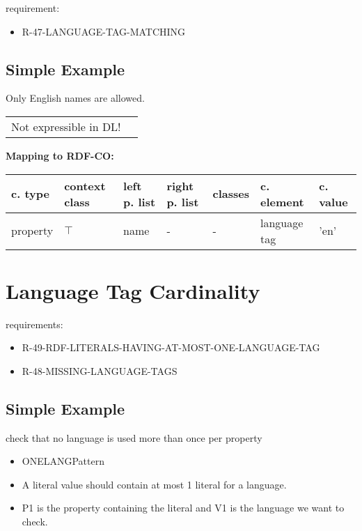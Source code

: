 \documentclass{llncs}
\newenvironment{gcotable}{
  \scriptsize
  \sffamily
  \vspace{0cm}
	\begin{center}
	\textbf{\vspace{0.4cm}Mapping to RDF-CO:} \\
  \begin{tabular}{l|l|l|l|l|l|l}
	\hline
  \textbf{c. type} & \textbf{context class} & \textbf{left p. list} & \textbf{right p. list} & \textbf{classes} & \textbf{c. element} & \textbf{c. value} \\
  \hline

}{
  \hline
  \end{tabular}
	\end{center}
}
\newenvironment{DL}{
  \vspace{0cm}
	\begin{center}
  \begin{tabular}{r l}

}{
  \end{tabular}
	\end{center}
}
\begin{document}
requirement:

\begin{itemize}
	\item R-47-LANGUAGE-TAG-MATCHING
\end{itemize}

\subsection{Simple Example}

Only English names are allowed.

\begin{DL}
Not expressible in DL!
\end{DL}

\begin{gcotable}
property & $\top$ & name & - & - & language tag & 'en' \\
\end{gcotable}

\section{Language Tag Cardinality}

requirements:

\begin{itemize}
	\item R-49-RDF-LITERALS-HAVING-AT-MOST-ONE-LANGUAGE-TAG
	\item R-48-MISSING-LANGUAGE-TAGS
\end{itemize}

\subsection{Simple Example}

check that no language is used more than once per property


\begin{itemize}
	\item ONELANGPattern \cite{Kontokostas2014} 
  \item A literal value should contain at most 1 literal for a language. 
  \item P1 is the property containing the literal and V1 is the language we want to check.
\end{itemize}
\end{document}
